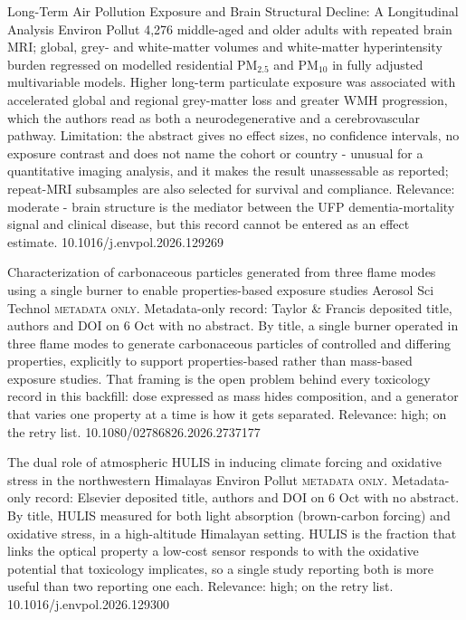 \documentclass[10pt]{article}
\begin{document}
{Long-Term Air Pollution Exposure and Brain Structural Decline: A Longitudinal Analysis}
{Environ Pollut}
{4,276 middle-aged and older adults with repeated brain MRI; global, grey- and white-matter volumes and white-matter hyperintensity burden regressed on modelled residential PM$_{2.5}$ and PM$_{10}$ in fully adjusted multivariable models. Higher long-term particulate exposure was associated with accelerated global and regional grey-matter loss and greater WMH progression, which the authors read as both a neurodegenerative and a cerebrovascular pathway. Limitation: the abstract gives no effect sizes, no confidence intervals, no exposure contrast and does not name the cohort or country - unusual for a quantitative imaging analysis, and it makes the result unassessable as reported; repeat-MRI subsamples are also selected for survival and compliance. Relevance: moderate - brain structure is the mediator between the UFP dementia-mortality signal and clinical disease, but this record cannot be entered as an effect estimate.}
{10.1016/j.envpol.2026.129269}

\par{}\baselineskip{}\baselineskip
{}

{Characterization of carbonaceous particles generated from three flame modes using a single burner to enable properties-based exposure studies}
{Aerosol Sci Technol}
{\textsc{metadata only.} Metadata-only record: Taylor \& Francis deposited title, authors and DOI on 6 Oct with no abstract. By title, a single burner operated in three flame modes to generate carbonaceous particles of controlled and differing properties, explicitly to support properties-based rather than mass-based exposure studies. That framing is the open problem behind every toxicology record in this backfill: dose expressed as mass hides composition, and a generator that varies one property at a time is how it gets separated. Relevance: high; on the retry list.}
{10.1080/02786826.2026.2737177}

{The dual role of atmospheric HULIS in inducing climate forcing and oxidative stress in the northwestern Himalayas}
{Environ Pollut}
{\textsc{metadata only.} Metadata-only record: Elsevier deposited title, authors and DOI on 6 Oct with no abstract. By title, HULIS measured for both light absorption (brown-carbon forcing) and oxidative stress, in a high-altitude Himalayan setting. HULIS is the fraction that links the optical property a low-cost sensor responds to with the oxidative potential that toxicology implicates, so a single study reporting both is more useful than two reporting one each. Relevance: high; on the retry list.}
{10.1016/j.envpol.2026.129300}
\end{document}
